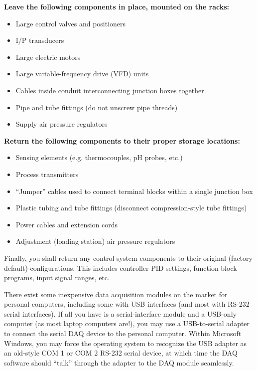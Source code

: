 \begin{itemize}
\vskip 10pt

\indent
{\bf Leave the following components in place, mounted on the racks:}

\begin{itemize}
\item{} Large control valves and positioners
\item{} I/P transducers
\item{} Large electric motors
\item{} Large variable-frequency drive (VFD) units
\item{} Cables inside conduit interconnecting junction boxes together
\item{} Pipe and tube fittings (do not unscrew pipe threads)
\item{} Supply air pressure regulators
\end{itemize}

\vskip 10pt

\indent
{\bf Return the following components to their proper storage locations:}

\begin{itemize}
\item{} Sensing elements (e.g. thermocouples, pH probes, etc.)
\item{} Process transmitters
\item{} ``Jumper'' cables used to connect terminal blocks within a single junction box
\item{} Plastic tubing and tube fittings (disconnect compression-style tube fittings)
\item{} Power cables and extension cords
\item{} Adjustment (loading station) air pressure regulators
\end{itemize}

\vskip 10pt

Finally, you shall return any control system components to their original (factory default) configurations.  This includes controller PID settings, function block programs, input signal ranges, etc.








There exist some inexpensive data acquisition modules on the market for personal computers, including some with USB interfaces (and most with RS-232 serial interfaces).  If all you have is a serial-interface module and a USB-only computer (as most laptop computers are!), you may use a USB-to-serial adapter to connect the serial DAQ device to the personal computer.  Within Microsoft Windows, you may force the operating system to recognize the USB adapter as an old-style COM 1 or COM 2 RS-232 serial device, at which time the DAQ software should ``talk'' through the adapter to the DAQ module seamlessly.


\end{itemize}
